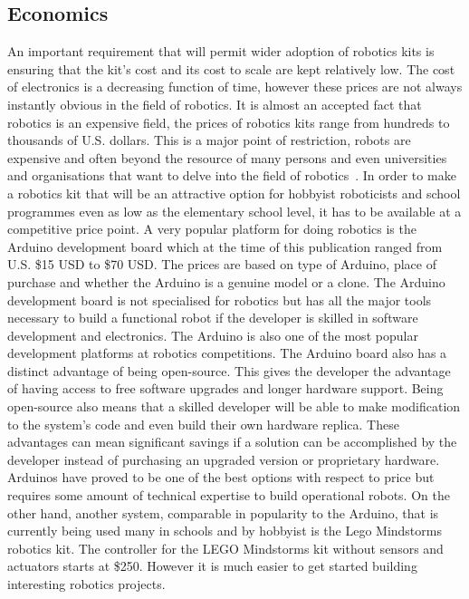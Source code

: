 \subsection{Economics} %
An important requirement that will permit wider adoption of robotics kits is ensuring that the kit's cost and its cost to scale are kept relatively low. The cost of electronics is a decreasing function of time, however these prices are not always instantly obvious in the field of robotics. It is almost an accepted fact that robotics is an expensive field, the prices of robotics kits range from hundreds to thousands of U.S. dollars. This is a major point of restriction, robots are expensive and often beyond the resource of many persons and even universities and organisations that want to delve into the field of robotics~\parencite{vr}. In order to make a robotics kit that will be an attractive option for hobbyist roboticists and school programmes even as low as the elementary school level, it has to be available at a competitive price point. A very popular platform for doing robotics is the Arduino development board which at the time of this publication ranged from U.S. \$15 USD to \$70 USD. The prices are based on type of Arduino, place of purchase and whether the Arduino is a genuine model or a clone. The Arduino development board is not specialised for robotics but has all the major tools necessary to build a functional robot if the developer is skilled in software development and electronics. The Arduino is also one of the most popular development platforms at robotics competitions.
The Arduino board also has a distinct advantage of being open-source. This gives the developer the advantage of having access to free software upgrades and longer hardware support. Being open-source also means that a skilled developer will be able to make modification to the system's code and even build their own hardware replica. These advantages can mean significant savings if a solution can be accomplished by the developer instead of purchasing an upgraded version or proprietary hardware. Arduinos have proved to be one of the best options with respect to price but requires some amount of technical expertise to build operational robots. On the other hand, another system, comparable in popularity to the Arduino, that is currently being used many in schools and by hobbyist is the Lego Mindstorms robotics kit. The controller for the LEGO Mindstorms kit without sensors and actuators starts at \$250. However it is much easier to get started building interesting robotics projects.




